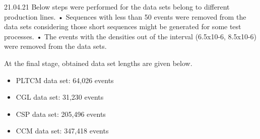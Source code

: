 {21.04.21
Below steps were performed for the data sets belong to different production lines.
•	Sequences with less than 50 events were removed from the data sets considering those short sequences might be generated for some test processes. 
•	The events with the densities out of the interval (6.5x10-6, 8.5x10-6) were removed from the data sets.

At the final stage, obtained data set lengths are given below.
\begin{itemize}
	\item PLTCM data set: 64,026 events
	\item CGL data set: 31,230 events
	\item CSP data set: 205,496 events
	\item CCM data set: 347,418 events
\end{itemize}
}

